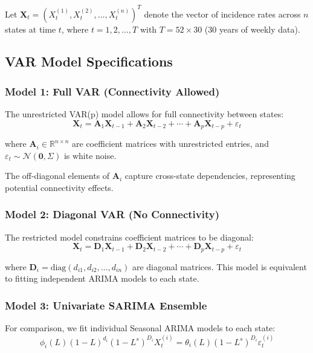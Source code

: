 Let $\mathbf{X}_t = (X_t^{(1)}, X_t^{(2)}, \ldots, X_t^{(n)})^T$ denote the vector of incidence rates across $n$ states at time $t$, where $t = 1, 2, \ldots, T$ with $T = 52 \times 30$ (30 years of weekly data).

\subsection{VAR Model Specifications}

\subsubsection{Model 1: Full VAR (Connectivity Allowed)}
The unrestricted VAR(p) model allows for full connectivity between states:
\begin{equation}
\mathbf{X}_t = \mathbf{A}_1 \mathbf{X}_{t-1} + \mathbf{A}_2 \mathbf{X}_{t-2} + \cdots + \mathbf{A}_p \mathbf{X}_{t-p} + {\varepsilon}_t \label{eq:var_full}
\end{equation}

where $\mathbf{A}_i \in \mathbb{R}^{n \times n}$ are coefficient matrices with unrestricted entries, and ${\varepsilon}_t \sim \mathcal{N}(\mathbf{0}, {\Sigma})$ is white noise.

The off-diagonal elements of $\mathbf{A}_i$ capture cross-state dependencies, representing potential connectivity effects.

\subsubsection{Model 2: Diagonal VAR (No Connectivity)}
The restricted model constrains coefficient matrices to be diagonal:
\begin{equation}
\mathbf{X}_t = \mathbf{D}_1 \mathbf{X}_{t-1} + \mathbf{D}_2 \mathbf{X}_{t-2} + \cdots + \mathbf{D}_p \mathbf{X}_{t-p} + {\varepsilon}_t \label{eq:var_diagonal}
\end{equation}

where $\mathbf{D}_i = \text{diag}(d_{i1}, d_{i2}, \ldots, d_{in})$ are diagonal matrices. This model is equivalent to fitting independent ARIMA models to each state.

\subsubsection{Model 3: Univariate SARIMA Ensemble}
For comparison, we fit individual Seasonal ARIMA models to each state:
\begin{equation}
\phi_i(L)(1-L)^{d_i}(1-L^s)^{D_i} X_t^{(i)} = \theta_i(L)(1-L^s)^{D_i}\varepsilon_t^{(i)} \label{eq:sarima}
\end{equation}

